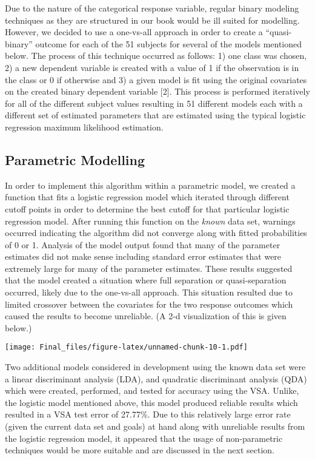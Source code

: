 \documentclass[]{article}
\let\origfigure\figure
\let\endorigfigure\endfigure
\renewenvironment{figure}[1][2] {
    \expandafter\origfigure\expandafter[H]
} {
    \endorigfigure
}
\begin{document}
Due to the nature of the categorical response variable, regular binary
modeling techniques as they are structured in our book would be ill
suited for modelling. However, we decided to use a one-vs-all approach
in order to create a ``quasi-binary'' outcome for each of the 51
subjects for several of the models mentioned below. The process of this
technique occurred as follows: 1) one class was chosen, 2) a new
dependent variable is created with a value of 1 if the observation is in
the class or 0 if otherwise and 3) a given model is fit using the
original covariates on the created binary dependent variable {[}2{]}.
This process is performed iteratively for all of the different subject
values resulting in 51 different models each with a different set of
estimated parameters that are estimated using the typical logistic
regression maximum likelihood estimation.

\subsection{Parametric Modelling}\label{parametric-modelling}

In order to implement this algorithm within a parametric model, we
created a function that fits a logistic regression model which iterated
through different cutoff points in order to determine the best cutoff
for that particular logistic regression model. After running this
function on the \emph{known} data set, warnings occurred indicating the
algorithm did not converge along with fitted probabilities of 0 or 1.
Analysis of the model output found that many of the parameter estimates
did not make sense including standard error estimates that were
extremely large for many of the parameter estimates. These results
suggested that the model created a situation where full separation or
quasi-separation occurred, likely due to the one-vs-all approach. This
situation resulted due to limited crossover between the covariates for
the two response outcomes which caused the results to become unreliable.
(A 2-d visualization of this is given below.)

\begin{figure}
\centering
\texttt{[image: Final\_files/figure-latex/unnamed-chunk-10-1.pdf]}
\caption{Example of 2-d separation \label{figure:separation}}
\end{figure}

Two additional models considered in development using the known data set
were a linear discriminant analysis (LDA), and quadratic discriminant
analysis (QDA) which were created, performed, and tested for accuracy
using the VSA. Unlike, the logistic model mentioned above, this model
produced reliable results which resulted in a VSA test error of 27.77\%.
Due to this relatively large error rate (given the current data set and
goals) at hand along with unreliable results from the logistic
regression model, it appeared that the usage of non-parametric
techniques would be more suitable and are discussed in the next section.
\end{document}
